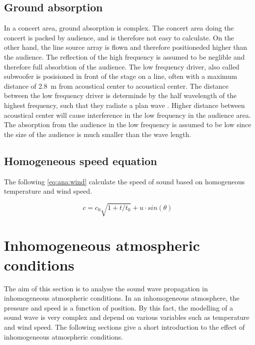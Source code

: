 \subsection{Ground absorption} 
In a concert area, ground absorption is complex. The concert area doing the concert is packed by audience, and is therefore not easy to calculate. On the other hand, the line source array is flown and therefore positioneded higher than the audience. The reflection of the high frequency is assumed to be neglible and therefore full absorbtion of the audience. The low frequency driver, also called subwoofer is posisioned in front of the stage on a line, often with a maximum distance of \SI{2.8}{\meter} from acoustical center to acoustical center. The distance between the low frequency driver is determinde by the half wavelength of the highest frequency, such that they radiate a plan wave \citep{bauman2001wavefront}. Higher distance between acoustical center will cause interference in the low frequency in the audience area. The absorption from the audience in the low frequency is assumed to be low since the size of the audience is much smaller than the wave length.   


 
 \subsection{Homogeneous speed equation}\label{sec:ana:inhom_ats_con}
 The following \autoref{eq:ana:wind} calculate the speed of sound based on homogeneous temperature and wind speed.

\begin{equation}\label{eq:ana:wind}
c =  c_0 \sqrt{1+t/t_0} + u \cdot sin(\theta)
\end{equation}  

\startexplain
{}
\stopexplain


 
\section{Inhomogeneous atmospheric conditions} 
The aim of this section is to analyse the sound wave propagation in inhomogeneous atmospheric conditions. In an inhomogeneous atmosphere, the pressure and speed is a function of position. By this fact, the modelling of a sound wave is very complex and depend on various variables such as temperature and wind speed. The following sections give a short introduction to the effect of inhomogeneous atmospheric conditions. 
 
